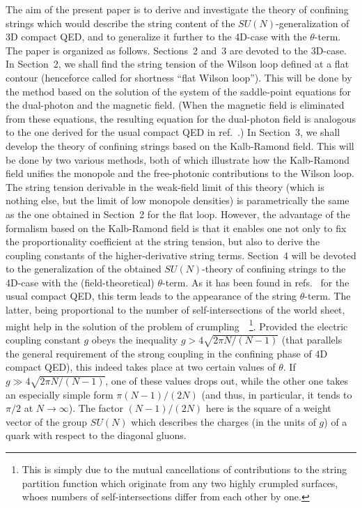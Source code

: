 \documentclass[a4paper,12pt]{article}
\begin{document}
The aim of the present paper is to derive and investigate the theory of confining
strings which would describe the string content of the $SU(N)$-generalization of 3D compact QED,
and to generalize it further to the 4D-case with the $\theta$-term.
The paper is organized as follows. Sections~2 and~3 are devoted to the 3D-case. In Section~2, we shall find
the string tension of the Wilson loop defined at a flat contour (henceforce called for shortness ``flat Wilson loop'').
This will be done by the method based on the solution of the system of the saddle-point equations for the dual-photon
and the magnetic field. (When the magnetic field is eliminated from these equations, the resulting equation for the dual-photon
field is analogous to the one derived for the usual compact QED in ref.~\cite{polpl}.)
In Section~3, we shall develop the theory of confining strings
based on the Kalb-Ramond field. This will be done by two various methods, both of which illustrate how the Kalb-Ramond field
unifies the monopole and the free-photonic contributions to the Wilson loop.
The string tension derivable in the weak-field limit of this theory (which is nothing else, but
the limit of low monopole densities)
is parametrically the same as the one
obtained in Section~2 for the flat loop. However, the advantage of the formalism based on the Kalb-Ramond field is that it enables
one not only to fix the proportionality coefficient at the string tension, but also to derive
the coupling constants of the higher-derivative string terms.
Section~4 will be devoted to the
generalization of the obtained $SU(N)$-theory of confining strings to the 4D-case with the (field-theoretical) $\theta$-term. As it has been
found in refs.~\cite{cristina, tq} for the usual compact QED, this term
leads to the appearance of the string $\theta$-term.  The latter,
being proportional to the number of self-intersections of the world sheet, might help in
the solution of the problem of crumpling~\cite{dg}~\footnote{This is simply due to the mutual cancellations of contributions to the string
partition function which originate from any two highly crumpled surfaces, whoes numbers of self-intersections differ from each other
by one.}.
Provided the electric coupling constant $g$ obeys the inequality $g>4\sqrt{2\pi N/(N-1)}$
(that parallels the general requirement of the strong coupling in the confining phase of 4D compact QED),
this indeed takes place
at two certain values of $\theta$. If $g\gg4\sqrt{2\pi N/(N-1)}$, one of these values drops out, while the other one
takes an especially simple form $\pi(N-1)/(2N)$
(and thus, in particular, it tends to $\pi/2$ at $N\to\infty$). The factor $(N-1)/(2N)$ here is the square of a weight vector of the
group $SU(N)$ which describes the charges (in the units of $g$) of a quark with respect to the diagonal gluons.
\end{document}
